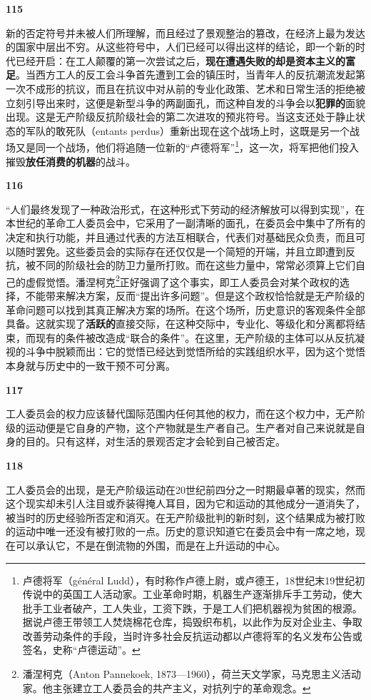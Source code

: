 \documentclass[fontset=fandol, a4paper, 12pt, openright]{ctexbook}
\makeatletter
\newcommand{\thesis}[1]{%
    \par\vspace{1.5em}%
    {\centering \textbf{\Large #1}\par}%
    \nobreak\vspace{0.5em}\nobreak
    \@afterindenttrue %
    \@afterheading    %
}
\makeatother
\begin{document}
\thesis{115}
新的否定符号并未被人们所理解，而且经过了景观整治的篡改，在经济上最为发达的国家中层出不穷。从这些符号中，人们已经可以得出这样的结论，即一个新的时代已经开启：在工人颠覆的第一次尝试之后，\textbf{现在遭遇失败的却是资本主义的富足}。当西方工人的反工会斗争首先遭到工会的镇压时，当青年人的反抗潮流发起第一次不成形的抗议，而且在抗议中对从前的专业化政策、艺术和日常生活的拒绝被立刻引导出来时，这便是新型斗争的两副面孔，而这种自发的斗争会以\textbf{犯罪的}面貌出现。这是无产阶级反抗阶级社会的第二次进攻的预兆符号。当这支还处于静止状态的军队的敢死队（entants perdus）重新出现在这个战场上时，这既是另一个战场又是同一个战场，他们将追随一位新的“卢德将军”\footnote{卢德将军（général Ludd），有时称作卢德上尉，或卢德王，18世纪末19世纪初传说中的英国工人活动家。工业革命时期，机器生产逐渐排斥手工劳动，使大批手工业者破产，工人失业，工资下跌，于是工人们把机器视为贫困的根源。据说卢德王带领工人焚烧棉花仓库，捣毁织布机，以此作为反对企业主、争取改善劳动条件的手段，当时许多社会反抗运动都以卢德将军的名义发布公告或签名，史称“卢德运动”。}，这一次，将军把他们投入摧毁\textbf{放任消费的机器}的战斗。

\thesis{116}
“人们最终发现了一种政治形式，在这种形式下劳动的经济解放可以得到实现”，在本世纪的革命工人委员会中，它采用了一副清晰的面孔，在委员会中集中了所有的决定和执行功能，并且通过代表的方法互相联合，代表们对基础民众负责，而且可以随时罢免。这些委员会的实际存在还仅仅是一个简短的开端，并且立即遭到反抗，被不同的阶级社会的防卫力量所打败。而在这些力量中，常常必须算上它们自己的虚假觉悟。潘涅柯克\footnote{潘涅柯克（Anton Pannekoek, 1873—1960），荷兰天文学家，马克思主义活动家。他主张建立工人委员会的共产主义，对抗列宁的革命观念。}正好强调了这个事实，即工人委员会对某个政权的选择，不能带来解决方案，反而“提出许多问题”。但是这个政权恰恰就是无产阶级的革命问题可以找到其真正解决方案的场所。在这个场所，历史意识的客观条件全部具备。这就实现了\textbf{活跃的}直接交际，在这种交际中，专业化、等级化和分离都将结束，而现有的条件被改造成“联合的条件”。在这里，无产阶级的主体可以从反抗凝视的斗争中脱颖而出：它的觉悟已经达到觉悟所给的实践组织水平，因为这个觉悟本身就与历史中的一致干预不可分离。

\thesis{117}
工人委员会的权力应该替代国际范围内任何其他的权力，而在这个权力中，无产阶级的运动便是它自身的产物，这个产物就是生产者自己。生产者对自己来说就是自身的目的。只有这样，对生活的景观否定才会轮到自己被否定。

\thesis{118}
工人委员会的出现，是无产阶级运动在20世纪前四分之一时期最卓著的现实，然而这个现实却未引人注目或乔装得掩人耳目，因为它和运动的其他成分一道消失了，被当时的历史经验所否定和消灭。在无产阶级批判的新时刻，这个结果成为被打败的运动中唯一还没有被打败的一点。历史的意识知道它在委员会中有一席之地，现在可以承认它，不是在倒流物的外围，而是在上升运动的中心。
\end{document}
